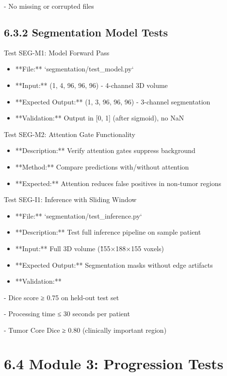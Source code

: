 - No missing or corrupted files


\subsection{6.3.2 Segmentation Model Tests}
Test SEG-M1: Model Forward Pass

\begin{itemize}
  \item **File:** `segmentation/test\_model.py`
  \item **Input:** (1, 4, 96, 96, 96) - 4-channel 3D volume
  \item **Expected Output:** (1, 3, 96, 96, 96) - 3-channel segmentation
  \item **Validation:** Output in [0, 1] (after sigmoid), no NaN
\end{itemize}

Test SEG-M2: Attention Gate Functionality

\begin{itemize}
  \item **Description:** Verify attention gates suppress background
  \item **Method:** Compare predictions with/without attention
  \item **Expected:** Attention reduces false positives in non-tumor regions
\end{itemize}

Test SEG-I1: Inference with Sliding Window

\begin{itemize}
  \item **File:** `segmentation/test\_inference.py`
  \item **Description:** Test full inference pipeline on sample patient
  \item **Input:** Full 3D volume (\~155×188×155 voxels)
  \item **Expected Output:** Segmentation masks without edge artifacts
  \item **Validation:**
\end{itemize}

- Dice score ≥ 0.75 on held-out test set

- Processing time ≤ 30 seconds per patient

- Tumor Core Dice ≥ 0.80 (clinically important region)


\section{6.4 Module 3: Progression Tests}

